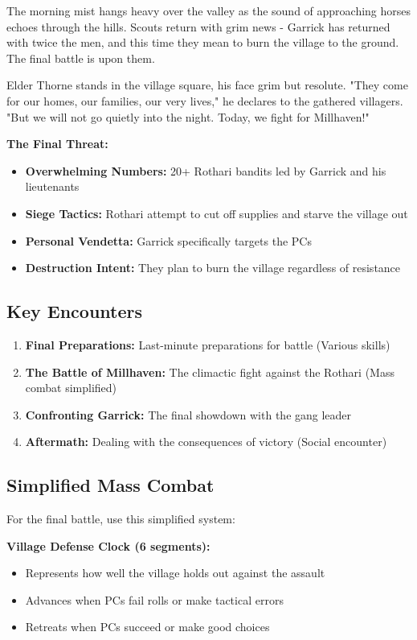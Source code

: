 \documentclass[11pt]{article}
\begin{document}
The morning mist hangs heavy over the valley as the sound of approaching horses echoes through the hills. Scouts return with grim news - Garrick has returned with twice the men, and this time they mean to burn the village to the ground. The final battle is upon them.

Elder Thorne stands in the village square, his face grim but resolute. "They come for our homes, our families, our very lives," he declares to the gathered villagers. "But we will not go quietly into the night. Today, we fight for Millhaven!"

\textbf{The Final Threat:}
\begin{itemize}
\item \textbf{Overwhelming Numbers:} 20+ Rothari bandits led by Garrick and his lieutenants
\item \textbf{Siege Tactics:} Rothari attempt to cut off supplies and starve the village out
\item \textbf{Personal Vendetta:} Garrick specifically targets the PCs
\item \textbf{Destruction Intent:} They plan to burn the village regardless of resistance
\end{itemize}

\subsection{Key Encounters}

\begin{enumerate}
\item \textbf{Final Preparations:} Last-minute preparations for battle (Various skills)
\item \textbf{The Battle of Millhaven:} The climactic fight against the Rothari (Mass combat simplified)
\item \textbf{Confronting Garrick:} The final showdown with the gang leader
\item \textbf{Aftermath:} Dealing with the consequences of victory (Social encounter)
\end{enumerate}

\subsection{Simplified Mass Combat}

For the final battle, use this simplified system:

\textbf{Village Defense Clock (6 segments):}
\begin{itemize}
\item Represents how well the village holds out against the assault
\item Advances when PCs fail rolls or make tactical errors
\item Retreats when PCs succeed or make good choices
\end{itemize}
\end{document}
